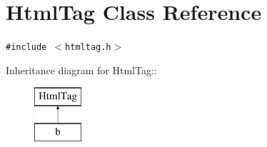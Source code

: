 \section{HtmlTag Class Reference}
\label{classHtmlTag}
{\tt \#include $<$htmltag.h$>$}

Inheritance diagram for HtmlTag::\begin{figure}[H]
\begin{center}
\leavevmode
\includegraphics[height=2cm]{classHtmlTag}
\end{center}
\end{figure}

